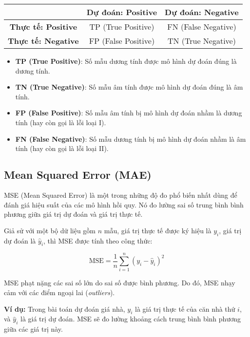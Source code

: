 \begin{center}
\begin{tabular}{|c|c|c|}
\hline
 & \textbf{Dự đoán: Positive} & \textbf{Dự đoán: Negative} \\
\hline
\textbf{Thực tế: Positive} & TP (True Positive) & FN (False Negative) \\
\hline
\textbf{Thực tế: Negative} & FP (False Positive) & TN (True Negative) \\
\hline
\end{tabular}
\end{center}

\begin{itemize}
    \item \textbf{TP (True Positive)}: Số mẫu dương tính được mô hình dự đoán đúng là dương tính.
    \item \textbf{TN (True Negative)}: Số mẫu âm tính được mô hình dự đoán đúng là âm tính.
    \item \textbf{FP (False Positive)}: Số mẫu âm tính bị mô hình dự đoán nhầm là dương tính (hay còn gọi là lỗi loại I).
    \item \textbf{FN (False Negative)}: Số mẫu dương tính bị mô hình dự đoán nhầm là âm tính (hay còn gọi là lỗi loại II).
\end{itemize}


\subsection {Mean Squared Error (MAE)}
\label{eval:mse}

MSE (Mean Squared Error) là một trong những độ đo phổ biến nhất dùng để đánh giá hiệu suất của các mô hình hồi quy. Nó đo lường sai số trung bình bình phương giữa giá trị dự đoán và giá trị thực tế.

Giả sử với một bộ dữ liệu gồm $n$ mẫu, giá trị thực tế được ký hiệu là $y_i$, giá trị dự đoán là $\hat{y}_i$, thì MSE được tính theo công thức:

\begin{equation}
\text{MSE} = \frac{1}{n} \sum_{i=1}^{n} (y_i - \hat{y}_i)^2
\end{equation}

MSE phạt nặng các sai số lớn do sai số được bình phương. Do đó, MSE nhạy cảm với các điểm ngoại lai (\textit{outliers}).

\vspace{0.3cm}
\noindent\textbf{Ví dụ:} Trong bài toán dự đoán giá nhà, $y_i$ là giá trị thực tế của căn nhà thứ $i$, và $\hat{y}_i$ là giá trị dự đoán. MSE sẽ đo lường khoảng cách trung bình bình phương giữa các giá trị này.


